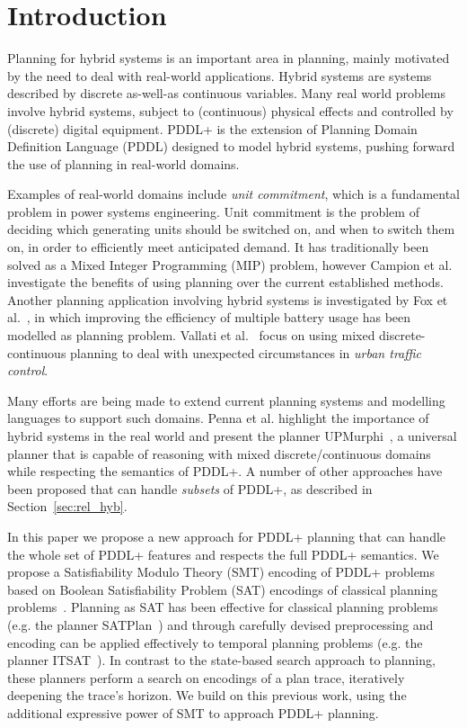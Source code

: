 \section{Introduction}

Planning for hybrid systems is an important area in planning, mainly motivated by the need to deal with real-world applications. Hybrid systems are systems described by discrete as-well-as continuous variables.
Many real world problems involve hybrid systems, subject to (continuous) physical effects and controlled by (discrete) digital equipment. PDDL+ \cite{pddl+} is the extension of Planning Domain Definition Language (PDDL) designed to model hybrid systems, pushing forward the use of planning in real-world domains.

Examples of real-world domains include \textit{unit commitment}, which is a fundamental problem in power systems engineering. Unit commitment is the problem of deciding which generating units should be switched on, and when to switch them on, in order to efficiently meet anticipated demand. It has traditionally been solved as a Mixed Integer Programming (MIP) problem, however Campion et al.~\cite{ucp} investigate the benefits of using planning over the current established methods.
Another planning application involving hybrid systems is investigated by Fox et al.~\cite{battery}, in which improving the efficiency of multiple battery usage has been modelled as planning problem.
Vallati et al.~\cite{utc} focus on using mixed discrete-continuous planning to deal with unexpected circumstances in \textit{urban traffic control}.

Many efforts are being made to extend current planning systems and modelling languages to support such domains. Penna et al. highlight the importance of hybrid systems in the real world and present the planner {\sc UPMurphi}~\cite{upmurphi}, a universal planner that is capable of reasoning with mixed discrete/continuous domains while respecting the semantics of PDDL+. A number of other approaches have been proposed that can handle \textit{subsets} of PDDL+, as described in Section~\ref{sec:rel_hyb}.

In this paper we propose a new approach for PDDL+ planning that can handle the whole set of PDDL+ features and respects the full PDDL+ semantics. We propose a Satisfiability Modulo Theory (SMT) encoding of PDDL+ problems based on Boolean Satisfiability Problem (SAT) encodings of classical planning problems~\cite{kau96,rin10}. Planning as SAT has been effective for classical planning problems (e.g. the planner SATPlan~\cite{kau06}) and through carefully devised preprocessing and encoding can be applied effectively to temporal planning problems (e.g. the planner ITSAT~\cite{ran15}). In contrast to the state-based search approach to planning, these planners perform a search on encodings of a plan trace, iteratively deepening the trace's horizon. We build on this previous work, using the additional expressive power of SMT to approach PDDL+ planning.

